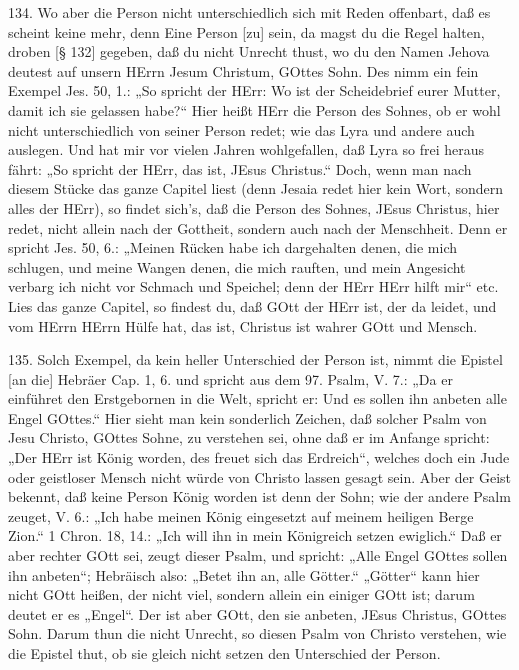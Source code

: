 134. Wo aber die Person nicht unterschiedlich sich mit Reden offenbart, daß es scheint keine mehr, denn Eine Person [zu] sein, da magst du die Regel halten, droben [§ 132] gegeben, daß du nicht Unrecht thust, wo du den Namen Jehova deutest auf unsern HErrn Jesum Christum, GOttes Sohn. Des nimm ein fein Exempel Jes. 50, 1.: „So spricht der HErr: Wo ist der Scheidebrief eurer Mutter, damit ich sie gelassen habe?“ Hier heißt HErr die Person des Sohnes, ob er wohl nicht unterschiedlich von seiner Person redet; wie das Lyra und andere auch auslegen. Und hat mir vor vielen Jahren wohlgefallen, daß Lyra so frei heraus fährt: „So spricht der HErr, das ist, JEsus Christus.“ Doch, wenn man nach diesem Stücke das ganze Capitel liest (denn Jesaia redet hier kein Wort, sondern alles der HErr), so findet sich’s, daß die Person des Sohnes, JEsus Christus, hier redet, nicht allein nach der Gottheit, sondern auch nach der Menschheit. Denn er spricht Jes. 50, 6.: „Meinen Rücken habe ich dargehalten denen, die mich schlugen, und meine Wangen denen, die mich rauften, und mein Angesicht verbarg ich nicht vor Schmach und Speichel; denn der HErr HErr hilft mir“ etc. Lies das ganze Capitel, so findest du, daß GOtt der HErr ist, der da leidet, und vom HErrn HErrn Hülfe hat, das ist, Christus ist wahrer GOtt und Mensch.

135. Solch Exempel, da kein heller Unterschied der Person ist, nimmt die Epistel [an die] Hebräer Cap. 1, 6. und spricht aus dem 97. Psalm, V. 7.: „Da er einführet den Erstgebornen in die Welt, spricht er: Und es sollen ihn anbeten alle Engel GOttes.“ Hier sieht man kein sonderlich Zeichen, daß solcher Psalm von Jesu Christo, GOttes Sohne, zu verstehen sei, ohne daß er im Anfange spricht: „Der HErr ist König worden, des freuet sich das Erdreich“, welches doch ein Jude oder geistloser Mensch nicht würde von Christo lassen gesagt sein. Aber der Geist bekennt, daß keine Person König worden ist denn der Sohn; wie der andere Psalm zeuget, V. 6.: „Ich habe meinen König eingesetzt auf meinem heiligen Berge Zion.“ 1 Chron. 18, 14.: „Ich will ihn in mein Königreich setzen ewiglich.“ Daß er aber rechter GOtt sei, zeugt dieser Psalm, und spricht: „Alle Engel GOttes sollen ihn anbeten“; Hebräisch also: „Betet ihn an, alle Götter.“ „Götter“ kann hier nicht GOtt heißen, der nicht viel, sondern allein ein einiger GOtt ist; darum deutet er es „Engel“. Der ist aber GOtt, den sie anbeten, JEsus Christus, GOttes Sohn. Darum thun die nicht Unrecht, so diesen Psalm von Christo verstehen, wie die Epistel thut, ob sie gleich nicht setzen den Unterschied der Person.

